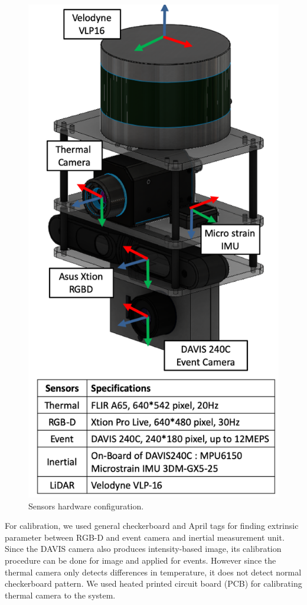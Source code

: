 \begin{figure}[!t]
	\centering
	\includegraphics[width=0.7\columnwidth]{figures/sensorconfig.png}
	
	\caption{Sensors hardware configuration.}
	
	\label{fig:sensors}
	\vspace{-6mm}
\end{figure}

For calibration, we used general checkerboard and April tags for finding
extrinsic parameter between RGB-D and event camera and inertial measurement
unit. Since the DAVIS camera also produces intensity-based image, its calibration
procedure can be done for image and applied for events. However since the
thermal camera only detects differences in temperature, it does not detect
normal checkerboard pattern. We used heated printed circuit board (PCB) for
calibrating thermal camera to the system.

